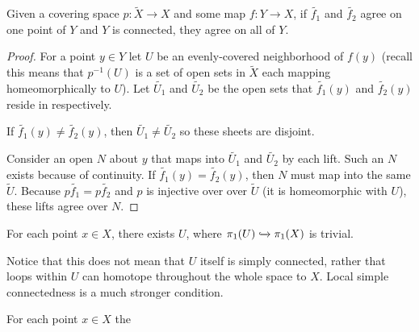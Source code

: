 \documentclass[10pt]{article}
\begin{document}
\begin{proposition}
	Given a covering space $p: \tilde{X} \to X$ and some map $f: Y \to X$, if
	$\tilde{f_1}$ and $\tilde{f_2}$ agree on one point of $Y$ and $Y$ is
	connected, they agree on all of $Y$.
\end{proposition}

\begin{proof}
	For a point $y \in Y$ let $U$ be an evenly-covered neighborhood of $f(y)$
	(recall this means that $p^{-1}(U)$ is a set of open sets in $\tilde{X}$ each
	mapping homeomorphically to $U$). Let $\tilde{U_1}$ and $\tilde{U_2}$ be the
	open sets that $\tilde{f_1}(y)$ and $\tilde{f_2}(y)$ reside in respectively.

	If $\tilde{f_1}(y) \neq \tilde{f_2}(y)$, then $\tilde{U_1} \neq \tilde{U_2}$
	so these sheets are disjoint.

	Consider an open $N$ about $y$ that maps into $\tilde{U_1}$ and $\tilde{U_2}$
	by each lift. Such an $N$ exists because of continuity. If $\tilde{f_1}(y)
	= \tilde{f_2}(y)$, then $N$ must map into the same $\tilde{U}$. Because
	$p\tilde{f_1} = p\tilde{f_2}$ and $p$ is injective over over $\tilde{U}$ (it
	is homeomorphic with $U$), these lifts agree over $N$.
\end{proof}

\begin{definition}
	For each point $x \in X$, there exists $U$, where $\pi_1(U)
	\xhookrightarrow{}{\pi_1(X)}$ is trivial.
\end{definition}

Notice that this does not mean that $U$ itself is simply connected, rather that
loops within $U$ can homotope throughout the whole space to $X$. Local simple
connectedness is a much stronger condition.

\begin{definition}
	For each point $x \in X$	the
\end{definition}
\end{document}
